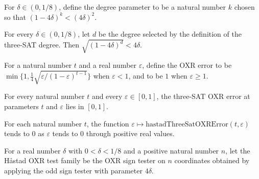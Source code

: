 \begin{definition}
\label{FABL.hastadThreeSatDegree}
\leanok
For $\delta\in(0,1/8)$, define the degree parameter to be a natural number $k$ chosen
so that $(1-4\delta)^k<(4\delta)^2$.
\end{definition}

\begin{theorem}
\label{FABL.hastadThreeSatDegree_tail_lt}
\leanok
{}
For every $\delta\in(0,1/8)$, let $d$ be the degree selected by the definition of the
three-SAT degree. Then $\sqrt{(1-4\delta)^d}<4\delta$.
\end{theorem}

\begin{definition}
\label{FABL.hastadThreeSatOXRError}
\leanok
For a natural number $t$ and a real number $\varepsilon$, define the OXR error to be
$\min\{1,\frac14\sqrt{\varepsilon/(1-\varepsilon)^{t-1}}\}$ when $\varepsilon<1$, and to
be $1$ when $\varepsilon\ge1$.
\end{definition}

\begin{theorem}
\label{FABL.hastadThreeSatOXRError_mem_Icc}
\leanok
{}
For every natural number $t$ and every $\varepsilon\in[0,1]$, the three-SAT OXR error at
parameters $t$ and $\varepsilon$ lies in $[0,1]$.
\end{theorem}

\begin{theorem}
\label{FABL.hastadThreeSatOXRError_tendsto_zero}
\leanok
{}
For each natural number $t$, the function $\varepsilon \mapsto
\mathrm{hastadThreeSatOXRError}(t,\varepsilon)$ tends to $0$ as $\varepsilon$ tends
to $0$ through positive real values.
\end{theorem}

\begin{definition}
\label{FABL.hastadOXRTestFamily}
\leanok
{}
For a real number $\delta$ with $0<\delta<1/8$ and a positive natural number $n$, let
the Håstad OXR test family be the OXR sign tester on $n$ coordinates obtained by
applying the odd sign tester with parameter $4\delta$.
\end{definition}


